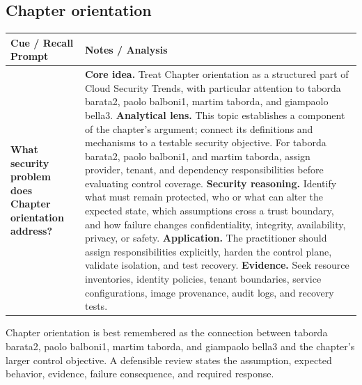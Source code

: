 \documentclass[11pt]{article}
\newcommand{\CornellHeader}{%
\rowcolor{Navy}\color{white}\bfseries Cue / Recall Prompt & \color{white}\bfseries Notes / Analysis\\\hline}
\newcommand{\CornellRow}[2]{%
\cellcolor{CueGray}\RaggedRight\textbf{#1} & \RaggedRight #2\\\hline}
\begin{document}
\subsection*{Chapter orientation}
\begin{longtable}{>{\RaggedRight\arraybackslash}p{}|>{\RaggedRight\arraybackslash}p{}}
\CornellHeader
\CornellRow{What security problem does Chapter orientation address?}{\textbf{Core idea.} Treat Chapter orientation as a structured part of Cloud Security Trends, with particular attention to taborda barata2, paolo balboni1, martim taborda, and giampaolo bella3. \textbf{Analytical lens.} This topic establishes a component of the chapter's argument; connect its definitions and mechanisms to a testable security objective. For taborda barata2, paolo balboni1, and martim taborda, assign provider, tenant, and dependency responsibilities before evaluating control coverage. \textbf{Security reasoning.} Identify what must remain protected, who or what can alter the expected state, which assumptions cross a trust boundary, and how failure changes confidentiality, integrity, availability, privacy, or safety. \textbf{Application.} The practitioner should assign responsibilities explicitly, harden the control plane, validate isolation, and test recovery. \textbf{Evidence.} Seek resource inventories, identity policies, tenant boundaries, service configurations, image provenance, audit logs, and recovery tests.}
\end{longtable}
\begin{topicsummary}
Chapter orientation is best remembered as the connection between taborda barata2, paolo balboni1, martim taborda, and giampaolo bella3 and the chapter's larger control objective. A defensible review states the assumption, expected behavior, evidence, failure consequence, and required response.
\end{topicsummary}
\end{document}
